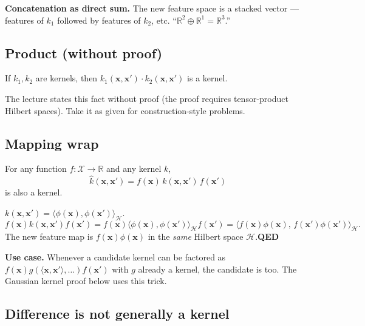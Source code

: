 \documentclass[11pt, a4paper]{article}
\newcommand{\doflag}{\textcolor{defBd}{\textbf{[DO]}}\,}
\begin{document}
\textbf{Concatenation as direct sum.} The new feature space is a stacked vector — features of $k_1$ followed by features of $k_2$, etc. ``$\mathbb{R}^2 \oplus \mathbb{R}^1 = \mathbb{R}^3$.''

\subsection{Product (without proof)}

\begin{defbox}
If $k_1, k_2$ are kernels, then $k_1(\mathbf{x}, \mathbf{x}')\cdot k_2(\mathbf{x}, \mathbf{x}')$ is a kernel.
\end{defbox}

The lecture states this fact without proof (the proof requires tensor-product Hilbert spaces). Take it as given for construction-style problems.

\subsection{Mapping wrap}

\begin{defbox}
For any function $f : \mathcal{X} \to \mathbb{R}$ and any kernel $k$,
\[
\hat k(\mathbf{x}, \mathbf{x}') = f(\mathbf{x})\,k(\mathbf{x}, \mathbf{x}')\,f(\mathbf{x}')
\]
is also a kernel.
\end{defbox}

\begin{exbox}[\doflag{}Proof]
$k(\mathbf{x}, \mathbf{x}') = \langle\phi(\mathbf{x}), \phi(\mathbf{x}')\rangle_{\mathcal{H}}$.
\[
f(\mathbf{x})k(\mathbf{x}, \mathbf{x}')f(\mathbf{x}') = f(\mathbf{x})\langle\phi(\mathbf{x}), \phi(\mathbf{x}')\rangle_{\mathcal{H}} f(\mathbf{x}') = \langle f(\mathbf{x})\phi(\mathbf{x}),\,f(\mathbf{x}')\phi(\mathbf{x}')\rangle_{\mathcal{H}}.
\]
The new feature map is $f(\mathbf{x})\phi(\mathbf{x})$ in the \emph{same} Hilbert space $\mathcal{H}$.\hfill\textbf{QED}
\end{exbox}

\textbf{Use case.} Whenever a candidate kernel can be factored as $f(\mathbf{x}) g(\langle\mathbf{x}, \mathbf{x}'\rangle, \ldots) f(\mathbf{x}')$ with $g$ already a kernel, the candidate is too. The Gaussian kernel proof below uses this trick.

\subsection{Difference is not generally a kernel}
\end{document}
